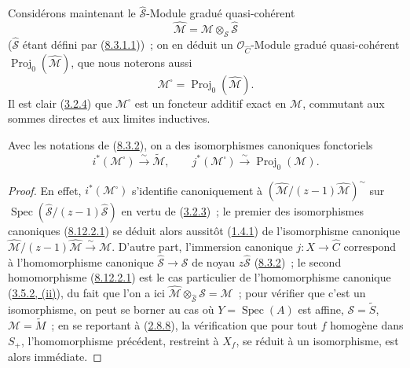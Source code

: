 \begin{env}[8.12.1]
Considérons maintenant le $\widehat{\mathcal{S}}$-Module gradué
quasi-cohérent
\begin{equation}
\label{II.8.12.1.4-fr}
  \widehat{\mathcal{M}}
  =\mathcal{M}\otimes_{\mathcal{S}}\widehat{\mathcal{S}}
\tag{8.12.1.4}
\end{equation}
($\widehat{\mathcal{S}}$ étant défini par
(\hyperref[II.8.3.1.1-fr]{8.3.1.1}))~; on en déduit un
$\mathcal{O}_{\widehat{C}}$-Module gradué quasi-cohérent
$\operatorname{Proj}_0(\widehat{\mathcal{M}})$, que nous noterons aussi
\begin{equation}
\label{II.8.12.1.5-fr}
  \mathcal{M}^{\square}=\operatorname{Proj}_0(\widehat{\mathcal{M}}).
\tag{8.12.1.5}
\end{equation}
Il est clair (\hyperref[II.3.2.4-fr]{3.2.4}) que
$\mathcal{M}^{\square}$ est un foncteur additif exact en $\mathcal{M}$,
commutant aux sommes directes et aux limites inductives.
\end{env}

\begin{proposition}[8.12.2]
\label{II.8.12.2-fr}
Avec les notations de (\hyperref[II.8.3.2-fr]{8.3.2}), on a des
isomorphismes canoniques fonctoriels
\begin{equation}
\label{II.8.12.2.1-fr}
  i^*(\mathcal{M}^{\square})\xrightarrow{\sim}\widetilde{\mathcal{M}},
  \qquad
  j^*(\mathcal{M}^{\square})\xrightarrow{\sim}
  \operatorname{Proj}_0(\mathcal{M}).
\tag{8.12.2.1}
\end{equation}
\end{proposition}

\begin{proof}
En effet, $i^*(\mathcal{M}^{\square})$ s'identifie canoniquement à
$\left(\widehat{\mathcal{M}}/(z-1)\widehat{\mathcal{M}}\right)^{\sim}$
sur
$\operatorname{Spec}(\widehat{\mathcal{S}}/(z-1)\widehat{\mathcal{S}})$
en vertu de (\hyperref[II.3.2.3-fr]{3.2.3})~; le premier des isomorphismes
canoniques (\hyperref[II.8.12.2.1-fr]{8.12.2.1}) se déduit alors aussitôt
(\hyperref[II.1.4.1-fr]{1.4.1}) de l'isomorphisme canonique
$\widehat{\mathcal{M}}/(z-1)\widehat{\mathcal{M}}
\xrightarrow{\sim}\mathcal{M}$. D'autre part, l'immersion canonique
$j:X\to\widehat{C}$ correspond à l'homomorphisme canonique
$\widehat{\mathcal{S}}\to\mathcal{S}$ de noyau
$z\widehat{\mathcal{S}}$ (\hyperref[II.8.3.2-fr]{8.3.2})~; le second
homomorphisme (\hyperref[II.8.12.2.1-fr]{8.12.2.1}) est le cas particulier
de l'homomorphisme canonique (\hyperref[II.3.5.2-fr]{3.5.2, (ii)}), du fait
que l'on a ici
$\widehat{\mathcal{M}}\otimes_{\widehat{\mathcal{S}}}\mathcal{S}
=\mathcal{M}$~; pour vérifier que c'est un isomorphisme, on peut se borner au
cas où $Y=\operatorname{Spec}(A)$ est affine,
$\mathcal{S}=\widetilde{S}$, $\mathcal{M}=\widetilde{M}$~; en se reportant à
(\hyperref[II.2.8.8-fr]{2.8.8}), la vérification que pour tout $f$ homogène
dans $S_+$, l'homomorphisme précédent, restreint à $X_f$, se réduit à un
isomorphisme, est alors immédiate.
\end{proof}


